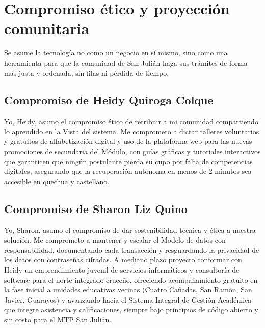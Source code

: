 \section{Compromiso ético y proyección comunitaria}
\label{sec:compromiso_comunitario}

Se asume la tecnología no como un negocio en sí mismo, sino como una herramienta para que la comunidad de San Julián haga sus trámites de forma más justa y ordenada, sin filas ni pérdida de tiempo.

\subsection{Compromiso de Heidy Quiroga Colque}
Yo, Heidy, asumo el compromiso ético de retribuir a mi comunidad compartiendo lo aprendido en la Vista del sistema. Me comprometo a dictar talleres voluntarios y gratuitos de alfabetización digital y uso de la plataforma web para las nuevas promociones de secundaria del Módulo, con guías gráficas y tutoriales interactivos que garanticen que ningún postulante pierda su cupo por falta de competencias digitales, asegurando que la recuperación autónoma en menos de 2 minutos sea accesible en quechua y castellano.

\subsection{Compromiso de Sharon Liz Quino}
Yo, Sharon, asumo el compromiso de dar sostenibilidad técnica y ética a nuestra solución. Me comprometo a mantener y escalar el Modelo de datos con responsabilidad, documentando cada transacción y resguardando la privacidad de los datos con contraseñas cifradas. A mediano plazo proyecto conformar con Heidy un emprendimiento juvenil de servicios informáticos y consultoría de software para el norte integrado cruceño, ofreciendo acompañamiento gratuito en la fase inicial a unidades educativas vecinas (Cuatro Cañadas, San Ramón, San Javier, Guarayos) y avanzando hacia el Sistema Integral de Gestión Académica que integre asistencia y calificaciones, siempre bajo principios de código abierto y sin costo para el MTP San Julián.
